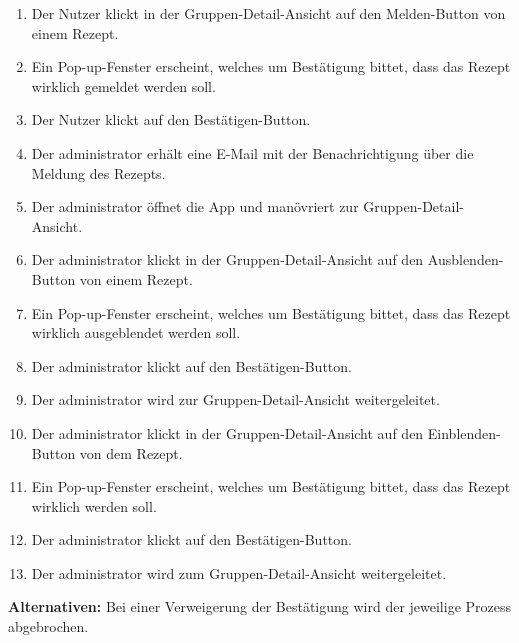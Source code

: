 \documentclass[parskip=full]{scrartcl}
\begin{document}
\begin{enumerate}
    \item Der Nutzer klickt in der Gruppen-Detail-Ansicht auf den Melden-Button von einem Rezept.
    \item Ein Pop-up-Fenster erscheint, welches um Bestätigung bittet, dass das Rezept wirklich gemeldet werden soll.
    \item Der Nutzer klickt auf den Bestätigen-Button.
    \item Der \Gls{administrator} erhält eine E-Mail mit der Benachrichtigung über die Meldung des Rezepts.
    \item Der \Gls{administrator} öffnet die App und manövriert zur Gruppen-Detail-Ansicht.
    \item Der \Gls{administrator} klickt in der Gruppen-Detail-Ansicht auf den Ausblenden-Button von einem Rezept.
    \item Ein Pop-up-Fenster erscheint, welches um Bestätigung bittet, dass das Rezept wirklich ausgeblendet werden soll.
    \item Der \Gls{administrator} klickt auf den Bestätigen-Button.
    \item Der \Gls{administrator} wird zur Gruppen-Detail-Ansicht weitergeleitet.
    \item Der \Gls{administrator} klickt in der Gruppen-Detail-Ansicht auf den Einblenden-Button von dem  Rezept.
    \item Ein Pop-up-Fenster erscheint, welches um Bestätigung bittet, dass das Rezept wirklich  werden soll.
    \item Der \Gls{administrator} klickt auf den Bestätigen-Button.
    \item Der \Gls{administrator} wird zum Gruppen-Detail-Ansicht weitergeleitet.
\end{enumerate}
\textbf{Alternativen:} Bei einer Verweigerung der Bestätigung wird der jeweilige Prozess abgebrochen.
\newpage
\end{document}
